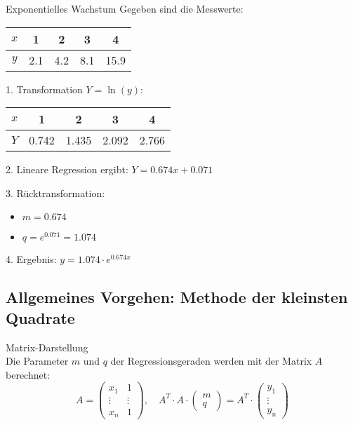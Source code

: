 \begin{example2}{Exponentielles Wachstum}
Gegeben sind die Messwerte:
\begin{center}
\begin{tabular}{|c|c|c|c|c|}
\hline
$x$ & 1 & 2 & 3 & 4 \\
\hline
$y$ & 2.1 & 4.2 & 8.1 & 15.9 \\
\hline
\end{tabular}
\end{center}

1. Transformation $Y=\ln(y)$:
\begin{center}
\begin{tabular}{|c|c|c|c|c|}
\hline
$x$ & 1 & 2 & 3 & 4 \\
\hline
$Y$ & 0.742 & 1.435 & 2.092 & 2.766 \\
\hline
\end{tabular}
\end{center}

2. Lineare Regression ergibt: $Y = 0.674x + 0.071$

3. Rücktransformation:
   \begin{itemize}
     \item $m = 0.674$
     \item $q = e^{0.071} = 1.074$
   \end{itemize}

4. Ergebnis: $y = 1.074 \cdot e^{0.674x}$
\end{example2}

\subsection{Allgemeines Vorgehen: Methode der kleinsten Quadrate}

\begin{definition}{Matrix-Darstellung}\\
Die Parameter $m$ und $q$ der Regressionsgeraden werden mit der Matrix $A$ berechnet:
$$A = \begin{pmatrix} x_1 & 1 \\ \vdots & \vdots \\ x_n & 1 \end{pmatrix}, \quad A^T \cdot A \cdot \begin{pmatrix} m \\ q \end{pmatrix} = A^T \cdot \begin{pmatrix} y_1 \\ \vdots \\ y_n \end{pmatrix}$$
\end{definition}

